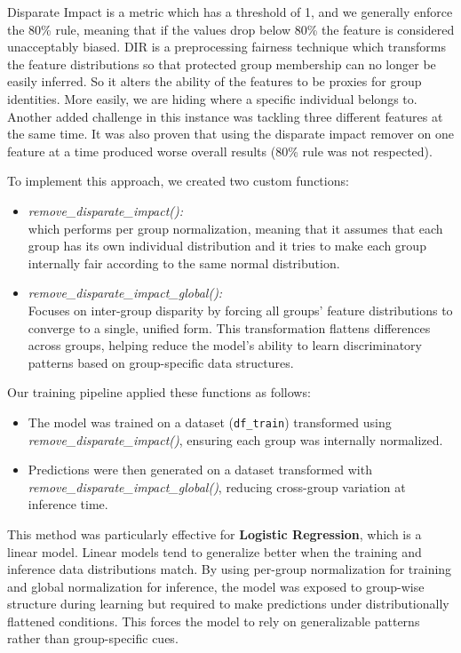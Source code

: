 \documentclass{article}
\begin{document}
Disparate Impact is a metric which has a threshold of 1, and we generally enforce the 80\% rule, meaning that if the values drop below 80\% the feature is considered unacceptably biased. DIR is a preprocessing fairness technique which transforms the feature distributions so that protected group membership can no longer be easily inferred. So it alters the ability of the features to be proxies for group identities. More easily, we are hiding where a specific individual belongs to. Another added challenge in this instance was tackling three different features at the same time. It was also proven that using the disparate impact remover on one feature at a time produced worse overall results (80\% rule was not respected).

To implement this approach, we created two custom functions:

\begin{itemize}
    \item \textit{remove\_disparate\_impact():} \\
    which performs per group normalization, meaning that it assumes that each group has its own individual distribution and it tries to make each group internally fair according to the same normal distribution. 

    \item \textit{remove\_disparate\_impact\_global():} \\
    Focuses on inter-group disparity by forcing all groups’ feature distributions to converge to a single, unified form. This transformation flattens differences across groups, helping reduce the model’s ability to learn discriminatory patterns based on group-specific data structures.
\end{itemize}

Our training pipeline applied these functions as follows:

\begin{itemize}
    \item The model was trained on a dataset (\texttt{df\_train}) transformed using \textit{remove\_disparate\_impact()}, ensuring each group was internally normalized.
    \item Predictions were then generated on a dataset transformed with \textit{remove\_disparate\_impact\_global()}, reducing cross-group variation at inference time.
\end{itemize}

This method was particularly effective for \textbf{Logistic Regression}, which is a linear model. Linear models tend to generalize better when the training and inference data distributions match. By using per-group normalization for training and global normalization for inference, the model was exposed to group-wise structure during learning but required to make predictions under distributionally flattened conditions. This forces the model to rely on generalizable patterns rather than group-specific cues.
\end{document}
